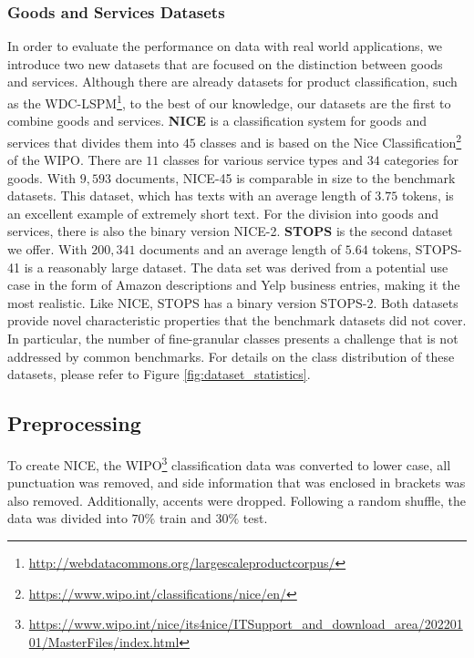 \documentclass[runningheads]{llncs}
\begin{document}
\subsubsection{Goods and Services Datasets}
\label{ŝec:new-datasets}
In order to evaluate the performance on data with real world applications, we introduce two new datasets that are focused on the distinction between goods and services.
Although there are already datasets for product classification, such as the WDC-LSPM\footnote{\url{http://webdatacommons.org/largescaleproductcorpus/}}, to the best of our knowledge, our datasets are the first to combine goods and services.
\textbf{NICE} is a classification system for goods and services that divides them into $45$ classes and is based on the Nice Classification\footnote{\url{https://www.wipo.int/classifications/nice/en/}} of the \ac{WIPO}. There are $11$ classes for various service types and $34$ categories for goods.
With $9,593$ documents, NICE-45 is comparable in size to the benchmark datasets.
This dataset, which has texts with an average length of $3.75$ tokens, is an excellent example of extremely short text. 
For the division into goods and services, there is also the binary version NICE-2.
\textbf{\ac{STOPS}} is the second dataset we offer. With $200,341$ documents and an average length of $5.64$ tokens, STOPS-41 is a reasonably large dataset. The data set was derived from a potential use case in the form of Amazon descriptions and Yelp business entries, making it the most realistic. Like NICE, STOPS has a binary version STOPS-2.
Both datasets provide novel characteristic properties that the benchmark datasets did not cover. In particular, the number of fine-granular classes presents a challenge that is not addressed by common benchmarks. For details on the class distribution of these datasets, please refer to Figure \ref{fig:dataset_statistics}.


\subsection{Preprocessing}
\label{sec:preprocessing}
To create NICE, the \ac{WIPO}\footnote{\url{https://www.wipo.int/nice/its4nice/ITSupport\_and\_download\_area/20220101/MasterFiles/index.html}} classification data was converted to lower case, all punctuation was removed, and side information that was enclosed in brackets was also removed. Additionally, accents were dropped.
Following a random shuffle, the data was divided into $70\%$ train and $30\%$ test.
\end{document}
